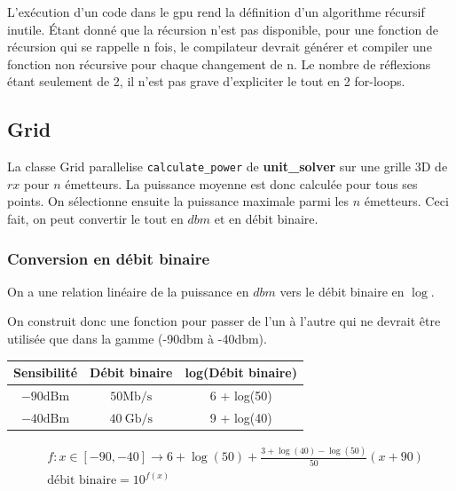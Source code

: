 \documentclass[sn-mathphys-num]{sn-jnl}
\begin{document}
\begin{tcolorbox}[colback=red!10!white,colframe=red!50!black,title=Remarque,sharp corners]
    L'exécution d'un code dans le gpu rend la définition d'un algorithme récursif inutile.
    Étant donné que la récursion n'est pas disponible, 
    pour une fonction de récursion qui se rappelle n fois, le compilateur
    devrait générer et compiler une fonction non récursive pour chaque changement de n.
    Le nombre de réflexions étant seulement de 2, il n'est pas grave d'expliciter le tout en 2 for-loops.
\end{tcolorbox}

\subsection{Grid}

La classe Grid parallelise \texttt{calculate\_power} de \textbf{unit\_solver} sur une grille 3D de $rx$ pour $n$ émetteurs.
La puissance moyenne est donc calculée pour tous ses points. On sélectionne
ensuite la puissance maximale parmi les $n$ émetteurs. Ceci fait, on peut convertir
le tout en $dbm$ et en débit binaire.

\subsubsection{Conversion en débit binaire}
\label{subsub:conversion_bin}

On a une relation linéaire de la puissance en $dbm$ vers le débit binaire en $\log$.

On construit donc une fonction pour passer de l'un à l'autre qui ne devrait
 être utilisée que dans la gamme (-90dbm à -40dbm).

\begin{table}[htbp]
\centering
\begin{tabular}{|ccc|}
    \hline Sensibilité & Débit binaire & log(Débit binaire) \\
    \hline$-90 \mathrm{dBm}$ & $50 \mathrm{Mb} / \mathrm{s}$ & 6 + log(50) \\
    \hline$-40 \mathrm{dBm}$ & $40 \mathrm{~Gb} / \mathrm{s}$ & 9 + log(40) \\
    \hline
\end{tabular}
\end{table}

\begin{align*}
    &f \colon x \in [-90, -40] \longrightarrow 6 + \log(50) + \frac{3 + \log(40) - \log(50)}{50} (x + 90)\\
    &\text{débit binaire} = 10^{f(x)}
\end{align*}
\end{document}
